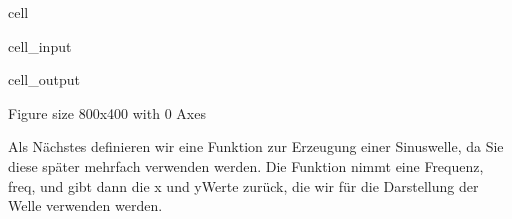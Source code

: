 \documentclass[letterpaper,10pt,english]{jupyterBook}
\begin{document}
\begin{sphinxuseclass}{cell}
\begin{sphinxVerbatimInput}
\begin{sphinxuseclass}{cell_input}
\end{sphinxuseclass}\end{sphinxVerbatimInput}
\begin{sphinxVerbatimOutput}

\begin{sphinxuseclass}{cell_output}
\begin{sphinxVerbatim}[commandchars=\\\{\}]
\PYGZlt{}Figure size 800x400 with 0 Axes\PYGZgt{}
\end{sphinxVerbatim}

\end{sphinxuseclass}\end{sphinxVerbatimOutput}

\end{sphinxuseclass}
\sphinxAtStartPar
Als Nächstes definieren wir eine Funktion zur Erzeugung einer Sinuswelle, da Sie diese später mehrfach verwenden werden. Die Funktion nimmt eine Frequenz, freq, und gibt dann die x\sphinxhyphen{} und y\sphinxhyphen{}Werte zurück, die wir für die Darstellung der Welle verwenden werden.
\end{document}
